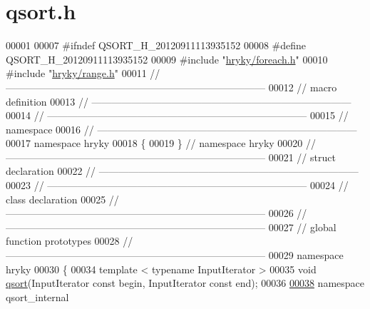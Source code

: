 \hypertarget{qsort_8h_source}{\section{qsort.\-h}
}

\begin{DoxyCode}
00001 
00007 \textcolor{preprocessor}{#ifndef QSORT\_H\_20120911113935152}
00008 \textcolor{preprocessor}{}\textcolor{preprocessor}{#define QSORT\_H\_20120911113935152}
00009 \textcolor{preprocessor}{}\textcolor{preprocessor}{#include "\hyperlink{foreach_8h}{hryky/foreach.h}"}
00010 \textcolor{preprocessor}{#include "\hyperlink{range_8h}{hryky/range.h}"}
00011 \textcolor{comment}{//
      ------------------------------------------------------------------------------}
00012 \textcolor{comment}{// macro definition}
00013 \textcolor{comment}{//
      ------------------------------------------------------------------------------}
00014 \textcolor{comment}{//
      ------------------------------------------------------------------------------}
00015 \textcolor{comment}{// namespace}
00016 \textcolor{comment}{//
      ------------------------------------------------------------------------------}
00017 \textcolor{keyword}{namespace }hryky
00018 \{
00019 \} \textcolor{comment}{// namespace hryky}
00020 \textcolor{comment}{//
      ------------------------------------------------------------------------------}
00021 \textcolor{comment}{// struct declaration}
00022 \textcolor{comment}{//
      ------------------------------------------------------------------------------}
00023 \textcolor{comment}{//
      ------------------------------------------------------------------------------}
00024 \textcolor{comment}{// class declaration}
00025 \textcolor{comment}{//
      ------------------------------------------------------------------------------}
00026 \textcolor{comment}{//
      ------------------------------------------------------------------------------}
00027 \textcolor{comment}{// global function prototypes}
00028 \textcolor{comment}{//
      ------------------------------------------------------------------------------}
00029 \textcolor{keyword}{namespace }hryky
00030 \{
00034     \textcolor{keyword}{template} < \textcolor{keyword}{typename} InputIterator >
00035     \textcolor{keywordtype}{void} \hyperlink{namespacehryky_a438e3ee8f5109856c4a1e4daa9980982}{qsort}(InputIterator \textcolor{keyword}{const} begin, InputIterator \textcolor{keyword}{const} end);
00036 
\hypertarget{qsort_8h_source_l00038}{}\hyperlink{namespacehryky_1_1qsort__internal}{00038}     \textcolor{keyword}{namespace }qsort\_internal

\end{DoxyCode}
